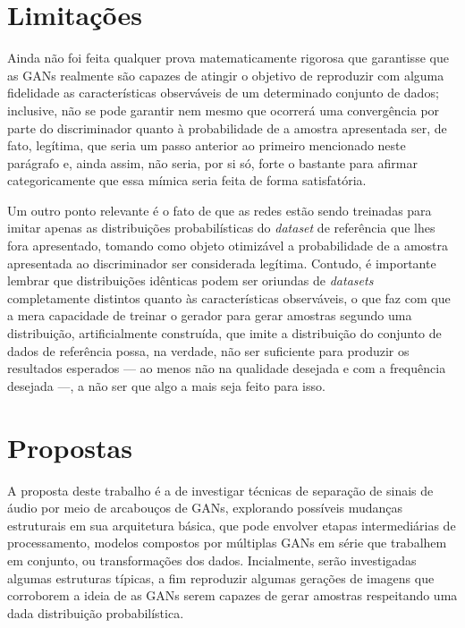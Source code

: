 \section{Limitações}
\label{sec:gan_for_bss_limitacoes}

Ainda não foi feita qualquer prova matematicamente rigorosa que garantisse que as GANs realmente são capazes de atingir o objetivo de reproduzir com alguma fidelidade as características observáveis de um determinado conjunto de dados; inclusive, não se pode garantir nem mesmo que ocorrerá uma convergência por parte do discriminador quanto à probabilidade de a amostra apresentada ser, de fato, legítima, que seria um passo anterior ao primeiro mencionado neste parágrafo e, ainda assim, não seria, por si só, forte o bastante para afirmar categoricamente que essa mímica seria feita de forma satisfatória.

Um outro ponto relevante é o fato de que as redes estão sendo treinadas para imitar apenas as distribuições probabilísticas do \textit{dataset} de referência que lhes fora apresentado, tomando como objeto otimizável a probabilidade de a amostra apresentada ao discriminador ser considerada legítima. Contudo, é importante lembrar que distribuições idênticas podem ser oriundas de \textit{datasets} completamente distintos quanto às características observáveis, o que faz com que a mera capacidade de treinar o gerador para gerar amostras segundo uma distribuição, artificialmente construída, que imite a distribuição do conjunto de dados de referência possa, na verdade, não ser suficiente para produzir os resultados esperados --- ao menos não na qualidade desejada e com a frequência desejada ---, a não ser que algo a mais seja feito para isso.



\section{Propostas}
\label{sec:gan_for_bss_propositions}

A proposta deste trabalho é a de investigar técnicas de separação de sinais de áudio por meio de arcabouços de GANs, explorando possíveis mudanças estruturais em sua arquitetura básica, que pode envolver etapas intermediárias de processamento, modelos compostos por múltiplas GANs em série que trabalhem em conjunto, ou transformações dos dados. Incialmente, serão investigadas algumas estruturas típicas, a fim reproduzir algumas gerações de imagens que corroborem a ideia de as GANs serem capazes de gerar amostras respeitando uma dada distribuição probabilística. 

